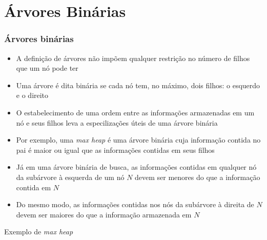 \section{Árvores Binárias}

\begin{frame}

    \frametitle{Árvores binárias}

    \begin{itemize}
        \item A definição de árvores {não impõem} qualquer restrição no 
        {número de filhos} que um nó pode ter
        

        \item Uma árvore é dita {binária} se cada nó tem, no máximo, dois filhos: o 
            {esquerdo} e o {direito}
        
        \item O estabelecimento de uma ordem entre as informações armazenadas em um nó e seus
            filhos leva a especilizações úteis de uma árvore binária

        \item Por exemplo, uma \textit{max heap} é uma árvore binária cuja informação contida no
            pai é maior ou igual que as informações contidas em seus filhos

        \item Já em uma árvore binária de busca, as informações contidas em qualquer nó da
            subárvore à esquerda de um nó $N$ devem ser menores do que a informação contida em $N$

        \item Do mesmo modo, as informações contidas nos nós da subárvore à direita de $N$ devem ser
            maiores do que a informação armazenada em $N$
    \end{itemize}

\end{frame}

\begin{frame}[fragile]{Exemplo de \textit{max heap}} 



\end{frame}

